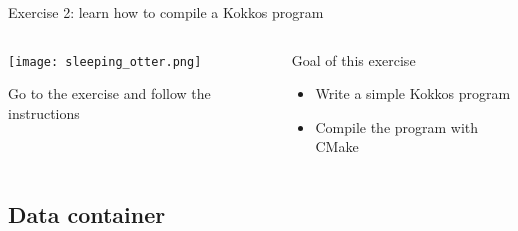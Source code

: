 \documentclass[aspectratio=169]{beamer}
\begin{document}

\begin{exerciseframe}{Exercise 2: learn how to compile a Kokkos program}
    \begin{columns}
        \begin{column}{0.5\linewidth}
            \begin{center}
                \texttt{[image: sleeping\_otter.png]}
            \end{center}

            Go to the exercise  and follow the instructions
        \end{column}
        \begin{column}{0.5\linewidth}
            \begin{block}{Goal of this exercise}
                \begin{itemize}
                    \item Write a simple Kokkos program
                    \item Compile the program with CMake
                \end{itemize}
            \end{block}
        \end{column}
    \end{columns}
\end{exerciseframe}


\subsection[Data container]{Data container}

\end{document}
